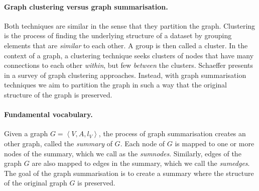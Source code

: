 \paragraph{Graph clustering versus graph summarisation.}

Both techniques are similar in the sense that they partition the graph.
Clustering is the process of finding the underlying structure of a dataset by grouping elements that are \emph{similar} to each other. A group is then called a cluster. In the context of a graph, a clustering technique seeks clusters of nodes that have many connections to each other \emph{within}, but few \emph{between} the clusters. Schaeffer presents in \cite{schaeffer:2007:graph} a survey of graph clustering approaches. Instead, with graph summarisation techniques we aim to partition the graph in such a way that the original structure of the graph is preserved.

\paragraph{Fundamental vocabulary.}

Given a graph $G = \left\langle V, A, l_V \right\rangle$, the process of graph summarisation creates an other graph, called the \emph{summary} of $G$. Each node of $G$ is mapped to one or more nodes of the summary, which we call as the \emph{sumnodes}. Similarly, edges of the graph $G$ are also mapped to edges in the summary, which we call the \emph{sumedges}. The goal of the graph summarisation is to create a summary where the structure of the original graph $G$ is preserved.

